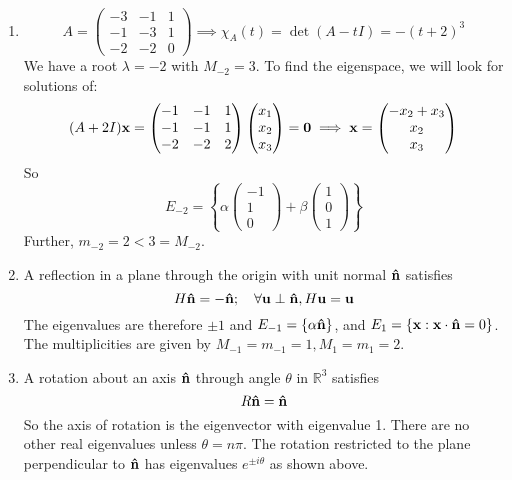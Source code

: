 \begin{enumerate}
	\item
	      \[
		      A = \begin{pmatrix}
			      -3 & -1 & 1 \\ -1 & -3 & 1 \\ -2 & -2 & 0
		      \end{pmatrix} \implies \chi_A(t) = \det(A - tI) = -(t + 2)^3
	      \]
	      We have a root \(\lambda = -2\) with \(M_{-2} = 3\).
	      To find the eigenspace, we will look for solutions of:
	      \[
		      (A + 2I)\vb x = \begin{pmatrix}
			      -1 & -1 & 1 \\ -1 & -1 & 1 \\ -2 & -2 & 2
		      \end{pmatrix} \begin{pmatrix}
			      x_1 \\ x_2 \\ x_3
		      \end{pmatrix} = \vb 0 \implies \vb x = \begin{pmatrix}
			      -x_2 + x_3 \\ x_2 \\ x_3
		      \end{pmatrix}
	      \]
	      So
	      \[
		      E_{-2} = \left\{ \alpha\begin{pmatrix}
			      -1 \\ 1 \\ 0
		      \end{pmatrix} + \beta\begin{pmatrix}
			      1 \\ 0 \\ 1
		      \end{pmatrix} \right\}
	      \]
	      Further, \(m_{-2} = 2 < 3 = M_{-2}\).

	\item A reflection in a plane through the origin with unit normal \(\vu{n}\) satisfies
	      \[
		      H\vu{n} = -\vu{n};\quad \forall \vb u \perp \vu{n}, H \vb u = \vb u
	      \]
	      The eigenvalues are therefore \(\pm 1\) and \(E_{-1} = \{ \alpha \vu{n} \}\), and \(E_1 = \{ \vb x: \vb x \cdot \vu{n} = 0 \}\).
	      The multiplicities are given by \(M_{-1} = m_{-1} = 1, M_1 = m_1 = 2\).

	\item A rotation about an axis \(\vu{n}\) through angle \(\theta\) in \(\mathbb R^3\) satisfies
	      \[
		      R\vu{n} = \vu{n}
	      \]
	      So the axis of rotation is the eigenvector with eigenvalue 1.
	      There are no other real eigenvalues unless \(\theta = n\pi\).
	      The rotation restricted to the plane perpendicular to \(\vu{n}\) has eigenvalues \(e^{\pm i \theta}\) as shown above.
\end{enumerate}

